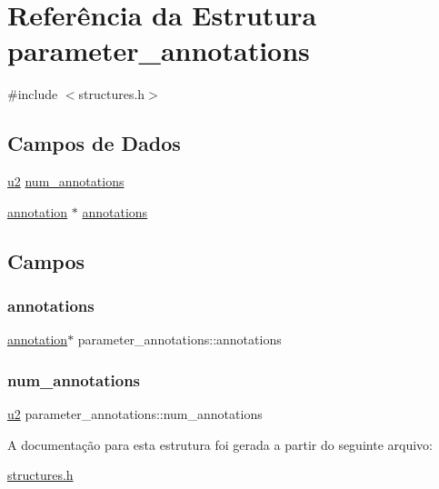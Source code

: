 \hypertarget{structparameter__annotations}{}\section{Referência da Estrutura parameter\+\_\+annotations}
\label{structparameter__annotations}


{\ttfamily \#include $<$structures.\+h$>$}

\subsection*{Campos de Dados}
\begin{DoxyCompactItemize}
\item 
\hyperlink{lista__operandos_8h_a732cde1300aafb73b0ea6c2558a7a54f}{u2} \hyperlink{structparameter__annotations_a7e5f9ee8189799d0424e291025d3c3fd}{num\+\_\+annotations}
\item 
\hyperlink{structannotation}{annotation} $\ast$ \hyperlink{structparameter__annotations_a89a4aee9ee71512a1f33395506db9d60}{annotations}
\end{DoxyCompactItemize}


\subsection{Campos}
\mbox{\label{structparameter__annotations_a89a4aee9ee71512a1f33395506db9d60}} 
\subsubsection{\texorpdfstring{annotations}{annotations}}
{\footnotesize\ttfamily \hyperlink{structannotation}{annotation}$\ast$ parameter\+\_\+annotations\+::annotations}

\mbox{\label{structparameter__annotations_a7e5f9ee8189799d0424e291025d3c3fd}} 
\subsubsection{\texorpdfstring{num\+\_\+annotations}{num\_annotations}}
{\footnotesize\ttfamily \hyperlink{lista__operandos_8h_a732cde1300aafb73b0ea6c2558a7a54f}{u2} parameter\+\_\+annotations\+::num\+\_\+annotations}



A documentação para esta estrutura foi gerada a partir do seguinte arquivo\+:\begin{DoxyCompactItemize}
\item 
\hyperlink{structures_8h}{structures.\+h}\end{DoxyCompactItemize}
